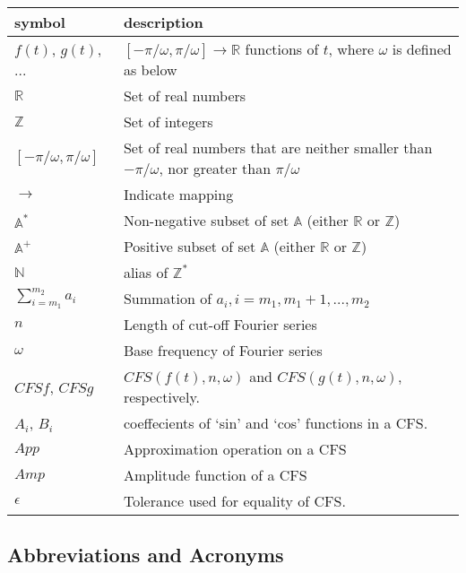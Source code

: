 \documentclass[12pt]{article}
\begin{document}
\renewcommand{\arraystretch}{1.2}
\noindent \begin{longtable*}{l l} \toprule
	\textbf{symbol} & \textbf{description}\\
	\midrule 
	$f(t)$, $g(t)$, ... & $[-\pi/\omega, \pi/\omega]\rightarrow\mathbb{R}$ 
	functions of $t$, where $\omega$ is defined as below\\
	$\mathbb{R}$ & Set of real numbers\\
	$\mathbb{Z}$ & Set of integers\\
	$[-\pi/\omega, \pi/\omega]$ & Set of real numbers that are neither smaller 
	than $-\pi/\omega$, nor greater than $\pi/\omega$ \\
	$\rightarrow$ & Indicate mapping\\
	$\mathbb{A}^{*}$ & Non-negative subset of set $\mathbb{A}$ (either $\mathbb{R}$ 
	or $\mathbb{Z}$)\\
	$\mathbb{A}^{+}$ & Positive subset of set $\mathbb{A}$ (either $\mathbb{R}$ 
	or $\mathbb{Z}$)\\
	$\mathbb{N}$ & alias of $\mathbb{Z}^{*}$\\
	$\sum_{i=m_1}^{m_2}a_i$ & Summation of $a_i, i=m_1, m_1+1, ..., m_2$\\
	$n$ & Length of cut-off Fourier series\\ 
	$\omega$ & Base frequency of Fourier series \\
	$\mathit{CFSf}$, $\mathit{CFSg}$ & $\mathit{CFS}(f(t), n, \omega)$ and 
	$\mathit{CFS}(g(t), n, \omega)$, respectively.\\
	$A_i$, $B_i$& coeffecients of `sin' and `cos' functions in a CFS.\\
	$\mathit{App}$& Approximation operation on a CFS\\
	$\mathit{Amp}$& Amplitude function of a CFS\\
	$\epsilon$& Tolerance used for equality of CFS.\\
	\bottomrule
\end{longtable*}

\subsection{Abbreviations and Acronyms}
\end{document}
